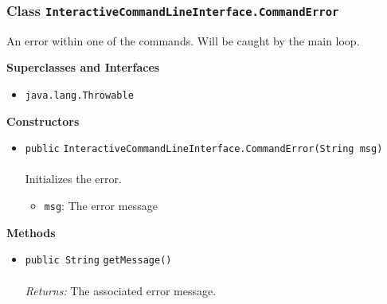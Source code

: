 \subsubsection{Class \lstinline|InteractiveCommandLineInterface.CommandError|}
An error within one of the commands. Will be caught by the main loop. \\
\noindent\begin{minipage}[t]{5cm}
\vspace{0.3em}
\hspace*{2em}
\vspace{0.3em}
\end{minipage}



\textbf{\sffamily Superclasses and Interfaces}
\begin{itemize}
\item \lstinline|java.lang.Throwable|
\end{itemize}


\textbf{\sffamily Constructors}
\begin{itemize}
\item \lstinline|public| \lstinline|InteractiveCommandLineInterface.CommandError|\lstinline|(String msg)|\\ \\[-0.6em]
Initializes the error.
\begin{itemize}
\item \lstinline|msg|: The error message
\end{itemize}



\end{itemize}


\textbf{\sffamily Methods}
\begin{itemize}
\item \lstinline|public String| \lstinline|getMessage|\lstinline|()|\\ \\[-0.6em]
\emph{Returns:} The associated error message.



\end{itemize}


